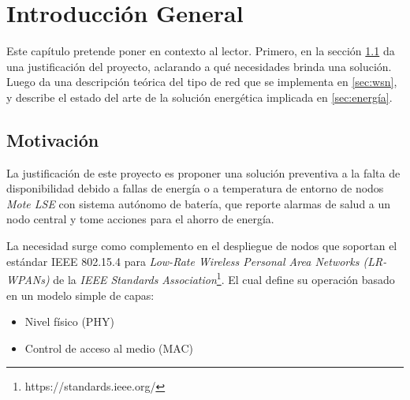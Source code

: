 
\chapter{Introducción General} %

\label{Chapter1} %
\label{IntroGeneral}


\newcommand{\keyword}[1]{\textbf{#1}}
\newcommand{\tabhead}[1]{\textbf{#1}}
\newcommand{\code}[1]{\texttt{#1}}
\newcommand{\file}[1]{\texttt{\bfseries#1}}
\newcommand{\option}[1]{\texttt{\itshape#1}}
\newcommand{\grados}{$^{\circ}$}


Este capítulo pretende poner en contexto al lector. Primero, en la sección \ref{sec:Motivación} da una justificación del proyecto, aclarando a qué necesidades brinda una solución. Luego da una descripción teórica del tipo de red que se implementa en \ref{sec:wsn}, y describe el estado del arte de la solución energética implicada en \ref{sec:energía}.

\section{Motivación}
\label{sec:Motivación}

La justificación de este proyecto es proponer una solución preventiva a la falta de disponibilidad debido a fallas de energía o a temperatura de entorno de nodos \textit{Mote LSE} con sistema autónomo de batería, que reporte alarmas de salud a un nodo central y tome acciones para el ahorro de energía.

La necesidad surge como complemento en el despliegue de nodos que soportan el estándar IEEE 802.15.4 \citep{802.15.4} para \textit{Low-Rate Wireless Personal Area Networks (LR-WPANs)} de la \textit{IEEE Standards Association}\footnote{https://standards.ieee.org/}. El cual define su operación basado en un modelo simple de capas:
		\begin{itemize}
			\item Nivel físico (PHY)
			\item Control de acceso al medio (MAC)
		\end{itemize}

